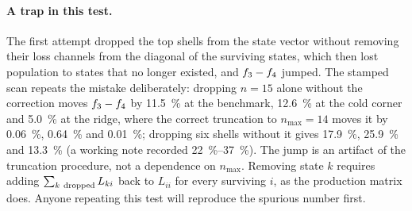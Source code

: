 \paragraph{A trap in this test.} The first attempt dropped the top shells from
the state vector without removing their loss channels from the diagonal of the
surviving states, which then lost population to states that no longer existed,
and $f_{3}-f_{4}$ jumped. The stamped scan repeats the mistake
deliberately: dropping $n=15$ alone without the correction moves
$f_{3}-f_{4}$ by \SI{11.5}{\percent} at the benchmark,
\SI{12.6}{\percent} at the cold corner and \SI{5.0}{\percent} at the ridge,
where the correct truncation to $n_{\max}=14$ moves it by \SI{0.06}{\percent},
\SI{0.64}{\percent} and \SI{0.01}{\percent}; dropping six shells without it
gives \SI{17.9}{\percent}, \SI{25.9}{\percent} and \SI{13.3}{\percent} (a
working note recorded \SIrange{22}{37}{\percent}). The jump is an artifact of
the truncation procedure, not a dependence on $n_{\max}$. Removing state $k$
requires adding $\sum_{k\ \rm dropped} L_{ki}$ back to $L_{ii}$ for every
surviving $i$, as the production matrix does. Anyone repeating this test will
reproduce the spurious number first.

